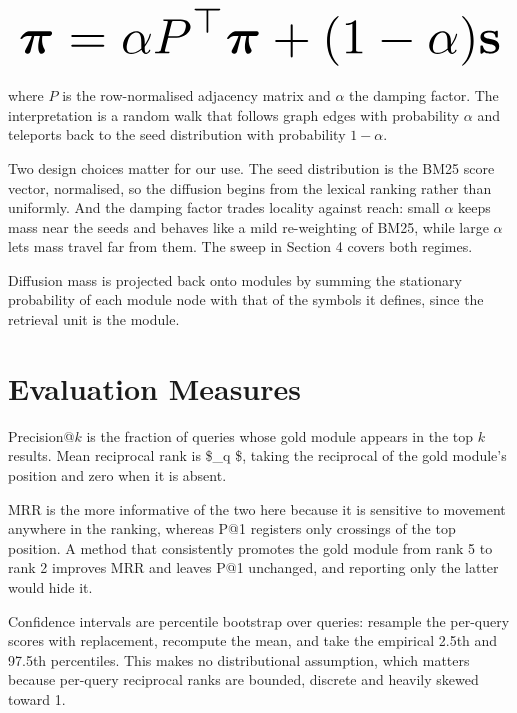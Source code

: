 \documentclass[10pt,twocolumn,letterpaper]{article}
\begin{document}
\begin{equation}
\resizebox{\columnwidth}{!}{$\displaystyle
\begin{aligned}
\boldsymbol{\pi} = \alpha P^{\top} \boldsymbol{\pi} + (1 - \alpha)\mathbf{s}
\end{aligned}
$}
\end{equation}




where $P$ is the row-normalised adjacency matrix and $\alpha$ the damping factor. The interpretation is a random walk that follows graph edges with probability $\alpha$ and teleports back to the seed distribution with probability $1 - \alpha$.

Two design choices matter for our use. The seed distribution is the BM25 score vector, normalised, so the diffusion begins from the lexical ranking rather than uniformly. And the damping factor trades locality against reach: small $\alpha$ keeps mass near the seeds and behaves like a mild re-weighting of BM25, while large $\alpha$ lets mass travel far from them. The sweep in Section 4 covers both regimes.

Diffusion mass is projected back onto modules by summing the stationary probability of each module node with that of the symbols it defines, since the retrieval unit is the module.


\section{Evaluation Measures}


Precision@$k$ is the fraction of queries whose gold module appears in the top $k$ results. Mean reciprocal rank is \$\sum\_{q} \$, taking the reciprocal of the gold module's position and zero when it is absent.

MRR is the more informative of the two here because it is sensitive to movement anywhere in the ranking, whereas P@1 registers only crossings of the top position. A method that consistently promotes the gold module from rank 5 to rank 2 improves MRR and leaves P@1 unchanged, and reporting only the latter would hide it.

Confidence intervals are percentile bootstrap over queries: resample the per-query scores with replacement, recompute the mean, and take the empirical 2.5th and 97.5th percentiles. This makes no distributional assumption, which matters because per-query reciprocal ranks are bounded, discrete and heavily skewed toward 1.
\end{document}
